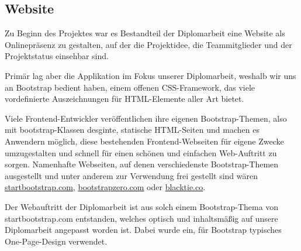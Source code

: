 \subsection{Website}
Zu Beginn des Projektes war es Bestandteil der Diplomarbeit eine Website als
Onlinepräsenz zu gestalten, auf der die Projektidee, die Teammitglieder und der
Projektstatus einsehbar sind.

Primär lag aber die Applikation im Fokus unserer Diplomarbeit, weshalb wir uns
an Bootstrap bedient haben, einem offenen CSS-Framework, das viele vordefinierte
Auszeichnungen für HTML-Elemente aller Art bietet.

Viele Frontend-Entwickler veröffentlichen ihre eigenen Bootstrap-Themen, also
mit bootstrap-Klassen desginte, statische HTML-Seiten und machen es Anwendern
möglich, diese bestehenden Frontend-Webseiten für eigene Zwecke umzugestalten
und schnell für einen schönen und einfachen Web-Auftritt zu sorgen. Namenhafte
Webseiten, auf denen verschiedenste Bootstrap-Themen ausgestellt und unter
anderem zur Verwendung frei gestellt sind wären \href{http://startbootstrap.com/}{startbootstrap.com},
\href{http://bootstrapzero.com/}{bootstrapzero.com} oder \href{http://blacktie.co/}{blacktie.co}.

Der Webauftritt der Diplomarbeit ist aus solch einem Bootstrap-Thema von
startbootstrap.com entstanden, welches optisch und inhaltsmäßig auf unsere
Diplomarbeit angepasst worden ist. Dabei wurde ein, für Bootstrap typisches
One-Page-Design verwendet.

